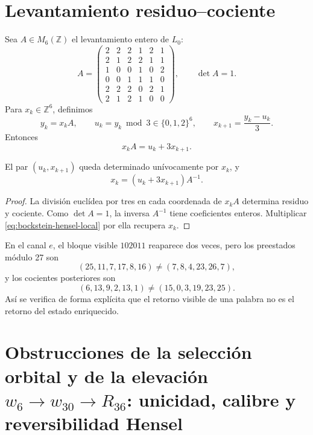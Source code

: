 \section{Levantamiento residuo--cociente}

Sea \(A\in M_6(\mathbb Z)\) el levantamiento entero de \(L_0\):
\[
 A=
\begin{pmatrix}
2&2&2&1&2&1\\
2&1&2&2&1&1\\
1&0&0&1&0&2\\
0&0&1&1&1&0\\
2&2&2&0&2&1\\
2&1&2&1&0&0
\end{pmatrix},
\qquad \det A=1.
\]
Para \(x_k\in\mathbb Z^6\), definimos
\[
 y_k=x_kA,
 \qquad
 u_k=y_k\bmod3\in\{0,1,2\}^6,
 \qquad
 x_{k+1}=\frac{y_k-u_k}{3}.
\]
Entonces
\begin{equation}
 x_kA=u_k+3x_{k+1}.
\label{eq:bockstein-hensel-local}
\end{equation}

\begin{theorem}
\label{thm:reversibilidad-bockstein-hensel}
El par \((u_k,x_{k+1})\) queda determinado unívocamente por \(x_k\), y
\[
 x_k=(u_k+3x_{k+1})A^{-1}.
\]
\end{theorem}

\begin{proof}
La división euclídea por tres en cada coordenada de \(x_kA\) determina
residuo y cociente. Como \(\det A=1\), la inversa \(A^{-1}\) tiene
coeficientes enteros. Multiplicar \cref{eq:bockstein-hensel-local} por ella
recupera \(x_k\).
\end{proof}

En el canal \(e\), el bloque visible \(102011\) reaparece dos veces, pero
los preestados módulo 27 son
\[
 (25,11,7,17,8,16)
 \neq
 (7,8,4,23,26,7),
\]
y los cocientes posteriores son
\[
 (6,13,9,2,13,1)
 \neq
 (15,0,3,19,23,25).
\]
Así se verifica de forma explícita que el retorno visible de una palabra no
es el retorno del estado enriquecido.

\section{Obstrucciones de la selección orbital y de la elevación \(w_6\to w_{30}\to R_{36}\): unicidad, calibre y reversibilidad Hensel}

